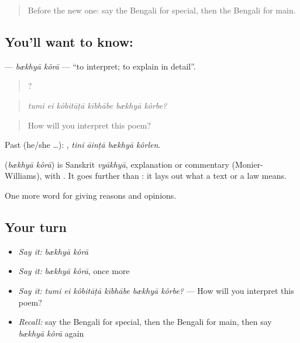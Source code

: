 \label{lesson:BN-C336-bekhya-kora}



\begin{quote}
Before the new one: say the Bengali for special, then the Bengali for main.
\end{quote}

\subsection*{You'll want to know:  }
\textbf{ } — \emph{bækhyā kôrā} — \textquotedblleft{}to interpret; to explain in detail\textquotedblright{}.

\begin{quote}
     ?
\end{quote}

\begin{quote}
\emph{tumi ei kôbitāṭā kībhābe bækhyā kôrbe?}
\end{quote}

\begin{quote}
How will you interpret this poem?
\end{quote}

Past (he/she …):    , \emph{tini āinṭā bækhyā kôrlen}.

\begin{cousinweb}
\textbf{ } (\emph{bækhyā kôrā}) is Sanskrit \emph{vyākhyā}, explanation or commentary (Monier-Williams), with . It goes further than : it lays out what a text or a law means.
\end{cousinweb}

\begin{grammarlens}[title={What you've built}]
One more word for giving reasons and opinions.
\end{grammarlens}

\subsection*{Your turn}
\begin{itemize}
\raggedright
  \item \emph{Say it:} \emph{bækhyā kôrā}
  \item \emph{Say it:} \emph{bækhyā kôrā}, once more
  \item \emph{Say it:} \emph{tumi ei kôbitāṭā kībhābe bækhyā kôrbe?} — How will you interpret this poem?
  \item \emph{Recall:} say the Bengali for special, then the Bengali for main, then say \emph{bækhyā kôrā} again
\end{itemize}

